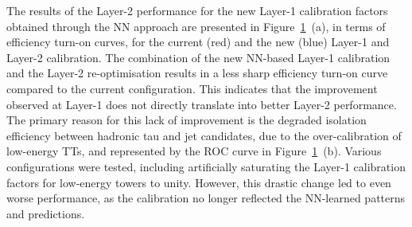 The results of the Layer-2 performance for the new Layer-1 calibration factors obtained through the NN approach are presented in Figure~\ref{fig:NN_Layer2}~(a), in terms of efficiency turn-on curves, for the current (red) and the new (blue) Layer-1 and Layer-2 calibration. The combination of the new NN-based Layer-1 calibration and the Layer-2 re-optimisation results in a less sharp efficiency turn-on curve compared to the current configuration. 
This indicates that the improvement observed at Layer-1 does not directly translate into better Layer-2 performance. The primary reason for this lack of improvement is the degraded isolation efficiency between hadronic tau and jet candidates, due to the over-calibration of low-energy TTs, and represented by the ROC curve in Figure~\ref{fig:NN_Layer2}~(b).
Various configurations were tested, including artificially saturating the Layer-1 calibration factors for low-energy towers to unity. However, this drastic change led to even worse performance, as the calibration no longer reflected the NN-learned patterns and predictions.

\begin{figure}
    \centering
    \hspace{1cm}
    \caption{}
    \label{fig:NN_Layer2}
\end{figure}

